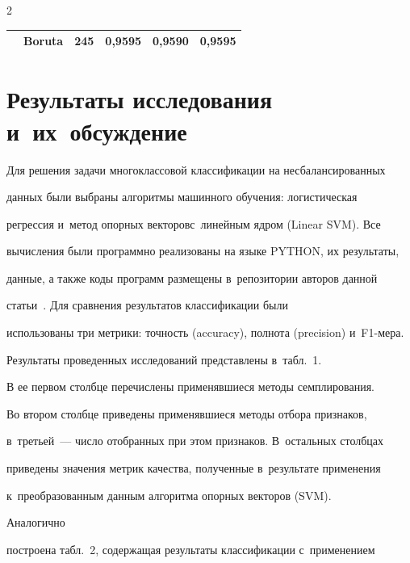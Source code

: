 \begin{multicols}{2}
\begin{table}
\begin{center}
\begin{tabular}{|l|l|c|c|c|c|}
&Boruta&245&0,9595&0,9590&0,9595\\

\hline

\end{tabular}

\end{center}

\end{table}

  

\section{Результаты исследования и~их~обсуждение}

 

  Для решения задачи многоклассовой классификации на несбалансированных 

данных были вы\-бра\-ны алгоритмы машинного обучения: ло\-ги\-стическая 

регрессия и~метод опорных векторов\linebreak с~линейным ядром (Linear SVM). Все 

вычисления были программно реализованы на языке PYTHON, их результаты, 

данные, а также коды программ размещены в~репозитории авторов данной 

статьи~\cite{11-sev}. Для сравнения результатов классификации были 

использованы три метрики: точность (accuracy), полнота (precision) и~F1-ме\-ра. 

Результаты проведенных исследований представлены в~табл.~1.

  



  

  В ее первом столбце перечислены применявшиеся методы семплирования. 

Во втором столбце приведены применявшиеся методы отбора признаков, 

в~третьей~--- число отобранных при этом признаков. В~остальных столбцах 

приведены значения метрик качества, полученные в~результате применения 

к~преобразованным данным алгоритма опорных векторов (SVM). 



Аналогично 

построена табл.~2, содержащая результаты классификации с~применением 


\end{multicols}
